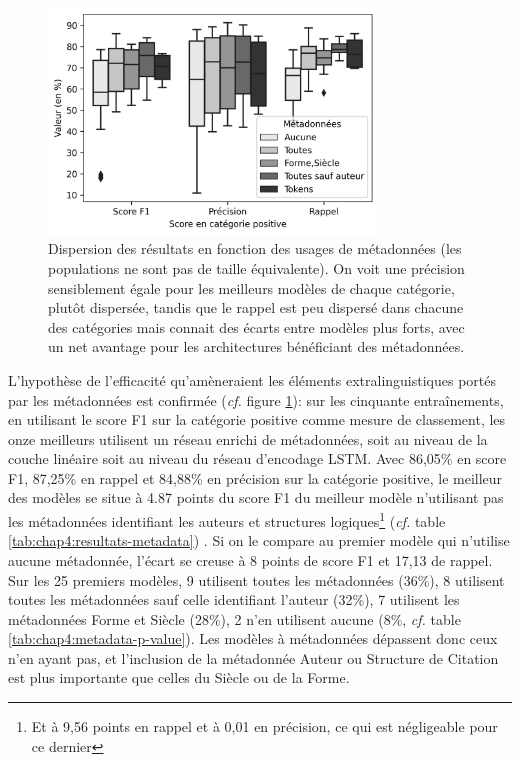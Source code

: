 \begin{figure}[ht]
    \centering
    \includegraphics[height=6cm]{figures/chap4/scoreMetadata.png}
    \caption{Dispersion des résultats en fonction des usages de métadonnées (les populations ne sont pas de taille équivalente). On voit une précision sensiblement égale pour les meilleurs modèles de chaque catégorie, plutôt dispersée, tandis que le rappel est peu dispersé dans chacune des catégories mais connait des écarts entre modèles plus forts, avec un net avantage pour les architectures bénéficiant des métadonnées.}
    \label{fig:chap4:metadata-boxplot}
\end{figure}

L'hypothèse de l'efficacité qu'amèneraient les éléments extralinguistiques portés par les métadonnées est confirmée (\textit{cf.} figure \ref{fig:chap4:metadata-boxplot}): sur les cinquante entraînements, en utilisant le score F1 sur la catégorie positive comme mesure de classement, les onze meilleurs utilisent un réseau enrichi de métadonnées, soit au niveau de la couche linéaire soit au niveau du réseau d'encodage LSTM. Avec 86,05\% en score F1, 87,25\% en rappel et 84,88\% en précision sur la catégorie positive, le meilleur des modèles se situe à 4.87 points du score F1 du meilleur modèle n'utilisant pas les métadonnées identifiant les auteurs et structures logiques\footnote{Et à 9,56 points en rappel et à 0,01 en précision, ce qui est négligeable pour ce dernier} (\textit{cf.} table \ref{tab:chap4:resultats-metadata}) . Si on le compare au premier modèle qui n'utilise aucune métadonnée, l'écart se creuse à 8 points de score F1 et 17,13 de rappel. Sur les 25 premiers modèles, 9 utilisent toutes les métadonnées (36\%), 8 utilisent toutes les métadonnées sauf celle identifiant l'auteur (32\%), 7 utilisent les métadonnées Forme et Siècle (28\%), 2 n'en utilisent aucune (8\%, \textit{cf.} table \ref{tab:chap4:metadata-p-value}). Les modèles à métadonnées dépassent donc ceux n'en ayant pas, et l'inclusion de la métadonnée Auteur ou Structure de Citation est plus importante que celles du Siècle ou de la Forme.


